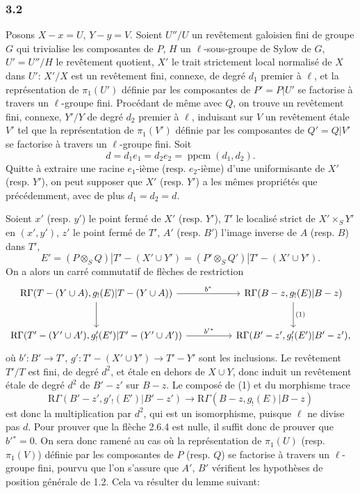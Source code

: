 \subsubsection*{3.2}
Posons $X-x=U$, $Y-y=V$. Soient $U''/U$ un revêtement galoisien fini de groupe $G$ qui trivialise les composantes de $P$, $H$ un $\ell$-sous-groupe de Sylow de $G$, $U'=U''/H$ le revêtement quotient, $X'$ le trait strictement local normalisé de $X$ dans $U'$: $X'/X$ est un revêtement fini, connexe, de degré $d_1$ premier à $\ell$, et la représentation de $\pi_1(U')$ définie par les composantes de $P'=P|U'$ se factorise à travers un $\ell$-groupe fini. Procédant de même avec $Q$, on trouve un revêtement fini, connexe, $Y'/Y$ de degré $d_2$ premier à $\ell$, induisant sur $V$ un revêtement étale $V'$ tel que la représentation de $\pi_1(V')$ définie par les composantes de $Q'=Q|V'$ se factorise à travers un $\ell$-groupe fini. Soit
\[
d=d_1e_1=d_2e_2=\operatorname{ppcm}(d_1,d_2).
\]
Quitte à extraire une racine $e_1$-ième (resp. $e_2$-ième) d'une uniformisante de $X'$ (resp. $Y'$), on peut supposer que $X'$ (resp. $Y'$) a les mêmes propriétés que précédemment, avec de plus $d_1=d_2=d$.

Soient $x'$ (resp. $y'$) le point fermé de $X'$ (resp. $Y'$), $T'$ le localisé strict de $X'\times_S Y'$ en $(x',y')$, $z'$ le point fermé de $T'$, $A'$ (resp. $B'$) l'image inverse de $A$ (resp. $B$) dans $T'$,
\[
E'=(P\otimes_S Q)|T'-(X'\cup Y')
   =(P'\otimes_S Q')|T'-(X'\cup Y').
\]
On a alors un carré commutatif de flèches de restriction
\[
\begin{tikzcd}[column sep=huge,row sep=large]
\mathrm{R}\Gamma(T-(Y\cup A),g_!(E)|T-(Y\cup A))
 \arrow[r,"b^*"] \arrow[d]
&
\mathrm{R}\Gamma(B-z,g_!(E)|B-z) \arrow[d,"(1)"]\\
\mathrm{R}\Gamma(T'-(Y'\cup A'),g'_!(E')|T'-(Y'\cup A'))
 \arrow[r,"b'{}^*"]
&
\mathrm{R}\Gamma(B'-z',g'_!(E')|B'-z') ,
\end{tikzcd}
\]
où $b':B'\to T'$, $g':T'-(X'\cup Y')\to T'-Y'$
sont les inclusions. Le revêtement $T'/T$ est fini, de degré $d^2$, et étale en dehors de $X\cup Y$, donc induit un revêtement étale de degré $d^2$ de $B'-z'$ sur $B-z$. Le composé de (1) et du morphisme trace
\[
\mathrm{R}\Gamma(B'-z',g'_!(E')|B'-z')
 \longrightarrow
\mathrm{R}\Gamma(B-z,g_!(E)|B-z)
\]
est donc la multiplication par $d^2$, qui est un isomorphisme, puisque $\ell$ ne divise pas $d$. Pour prouver que la flèche 2.6.4 est nulle, il suffit donc de prouver que $b'{}^*=0$. On sera donc ramené au cas où la représentation de $\pi_1(U)$ (resp. $\pi_1(V)$) définie par les composantes de $P$ (resp. $Q$) se factorise à travers un $\ell$-groupe fini, pourvu que l'on s'assure que $A'$, $B'$ vérifient les hypothèses de position générale de 1.2. Cela va résulter du lemme suivant:

